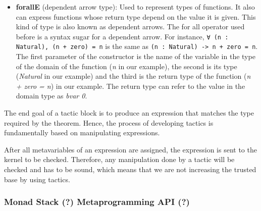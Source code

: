 \begin{itemize}
  \item \textbf{forallE} (dependent arrow type): Used to represent types of functions. It also can express functions whose return type depend on the value it is given. This kind of type is also known as dependent arrows. The for all operator used before is a syntax sugar for a dependent arrow. For instance, \texttt{∀ (n : Natural), (n + zero) = n} is the same as \texttt{(n : Natural) -> n + zero = n}. The first parameter of the constructor is the name of the variable in the type of the domain of the function (\textit{n} in our example), the second is its type (\textit{Natural} in our example) and the third is the return type of the function (\textit{n + zero = n}) in our example. The return type can refer to the value in the domain type as \textit{bvar 0}.
\end{itemize}

The end goal of a tactic block is to produce an expression that matches the type required by the theorem. Hence, the process of developing tactics is fundamentally based on manipulating expressions.

After all metavariables of an expression are assigned, the expression is sent to the kernel to be checked. Therefore, any manipulation done by a tactic will be checked and has to be sound, which means that we are not increasing the trusted base by using tactics.

\subsubsection{Monad Stack (?) Metaprogramming API (?)}
